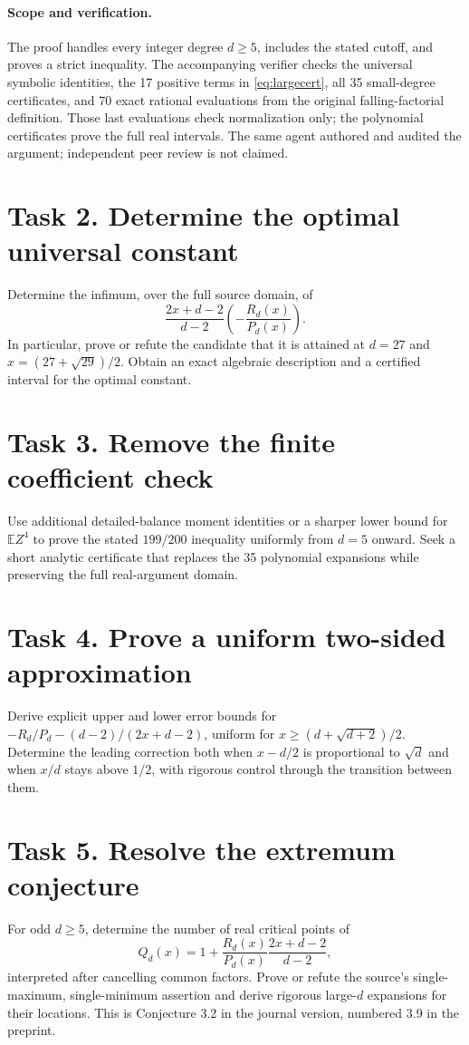 \documentclass[11pt]{article}
\begin{document}
\paragraph{Scope and verification.}
The proof handles every integer degree $d\ge5$, includes the stated
cutoff, and proves a strict inequality. The accompanying verifier
checks the universal symbolic identities, the 17 positive terms in
\eqref{eq:largecert}, all 35 small-degree certificates, and 70 exact
rational evaluations from the original falling-factorial definition.
Those last evaluations check normalization only; the polynomial
certificates prove the full real intervals. The same agent authored
and audited the argument; independent peer review is not claimed.

\section*{Task 2. Determine the optimal universal constant}
Determine the infimum, over the full source domain, of
\[
 \frac{2x+d-2}{d-2}\left(-\frac{R_d(x)}{P_d(x)}\right).
\]
In particular, prove or refute the candidate that it is attained at
$d=27$ and $x=(27+\sqrt{29})/2$. Obtain an exact algebraic
description and a certified interval for the optimal constant.

\section*{Task 3. Remove the finite coefficient check}
Use additional detailed-balance moment identities or a sharper lower
bound for $\mathbb E Z^4$ to prove the stated $199/200$ inequality
uniformly from $d=5$ onward. Seek a short analytic certificate that
replaces the 35 polynomial expansions while preserving the full
real-argument domain.

\section*{Task 4. Prove a uniform two-sided approximation}
Derive explicit upper and lower error bounds for
$-R_d/P_d-(d-2)/(2x+d-2)$, uniform for
$x\ge(d+\sqrt{d+2})/2$. Determine the leading correction both when
$x-d/2$ is proportional to $\sqrt d$ and when $x/d$ stays above
$1/2$, with rigorous control through the transition between them.

\section*{Task 5. Resolve the extremum conjecture}
For odd $d\ge5$, determine the number of real critical points of
\[
 Q_d(x)=1+\frac{R_d(x)}{P_d(x)}\frac{2x+d-2}{d-2},
\]
interpreted after cancelling common factors. Prove or refute the
source's single-maximum, single-minimum assertion and derive rigorous
large-$d$ expansions for their locations. This is Conjecture 3.2 in
the journal version, numbered 3.9 in the preprint.
\end{document}
